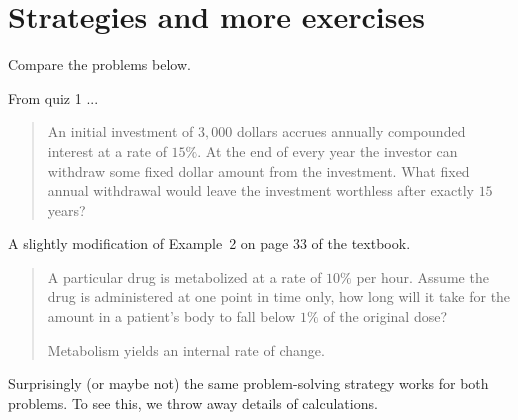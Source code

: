 \documentclass[../main.tex]{subfiles}
\begin{document}
 \section{Strategies and more exercises}

\begin{example} \label{ex:strategy-connection}
  Compare the problems below.

  From quiz 1 ...
  \begin{quote}
    An initial investment of \(3,000\) dollars accrues annually compounded interest at a rate of \(15\%\). At the end of every year the investor can withdraw some fixed dollar amount from the investment. What fixed annual withdrawal would leave the investment worthless after exactly \(15\) years?
  \end{quote}

  A slightly modification of Example~2 on page 33 of the textbook.
  \begin{quote}
    A particular drug is metabolized at a rate of \(10\%\) per hour. Assume the drug is administered at one point in time only, how long will it take for the amount in a patient's body to fall below \(1\%\) of the original dose?

    Metabolism yields an internal rate of change.
  \end{quote}

  Surprisingly (or maybe not) the same problem-solving strategy works for both problems.  To see this, we throw away details of calculations.

  \blanks*
\end{example}
\clearpage
\end{document}
